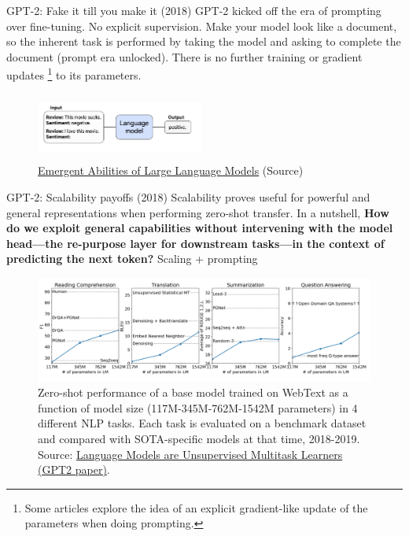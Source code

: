 \documentclass[9pt]{beamer}
\begin{document}
\begin{frame}{GPT-2: Fake it till you make it (2018)}  
   GPT-2 kicked off the era of prompting over fine-tuning. No explicit supervision. Make your model look like a document, so the inherent task is performed by taking the model and asking to complete the document (prompt era unlocked). There is no further training or gradient updates \footnote{Some articles explore the idea of an explicit gradient-like update of the parameters when doing prompting.} to its parameters. 

    \begin{figure}
        \centering
        \includegraphics[width = 5.5cm, height=2.2cm]{img/prompt-era-ex1.png}
        \caption{\href{https://arxiv.org/pdf/2206.07682.pdf}{Emergent Abilities of Large Language Models} (Source)}
        \label{fig:enter-label}
    \end{figure}
\end{frame}

\begin{frame}{GPT-2: Scalability payoffs (2018)}  
   Scalability proves useful for powerful and general representations when performing zero-shot transfer.
   In a nutshell, \textbf{How do we exploit general capabilities without intervening with the model head—the re-purpose layer for downstream tasks—in the context of predicting the next token?} Scaling + prompting

    \begin{figure}
        \centering
        \includegraphics[width=\textwidth]{img/gpt2-zero-shot-performance.png}
        \caption{Zero-shot performance of a base model trained on WebText as a function of model size (117M-345M-762M-1542M parameters) in 4 different NLP tasks. Each task is evaluated on a benchmark dataset and compared with SOTA-specific models at that time, 2018-2019. Source: \href{https://cdn.openai.com/better-language-models/language_models_are_unsupervised_multitask_learners.pdf}{Language Models are Unsupervised Multitask Learners (GPT2 paper)}.}
        \label{fig:enter-label}
    \end{figure}
\end{frame}
\end{document}
